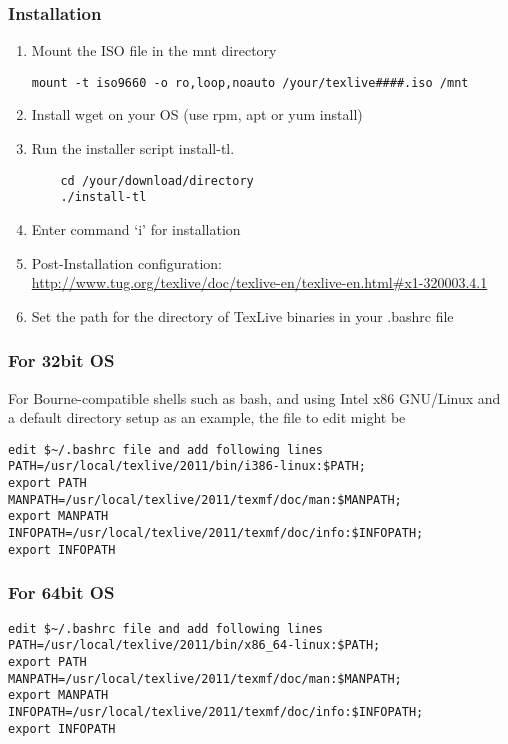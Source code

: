 \subsubsection*{Installation}
\begin{enumerate}
\item	Mount the ISO file in the mnt directory
\begin{verbatim}
mount -t iso9660 -o ro,loop,noauto /your/texlive####.iso /mnt
\end{verbatim}

\item	Install wget on your OS (use rpm, apt or yum install)
\item	Run the installer script install-tl.
\begin{verbatim}
	cd /your/download/directory
	./install-tl
\end{verbatim}
\item	Enter command `i' for installation

\item	Post-Installation configuration:\\
\href{http://www.tug.org/texlive/doc/texlive-en/texlive-en.html\#x1-320003.4.1}
{http://www.tug.org/texlive/doc/texlive-en/texlive-en.html\#x1-320003.4.1} 
\item	Set the path for the directory of TexLive binaries in your .bashrc file
\end{enumerate}

\subsubsection*{For 32bit OS}
For Bourne-compatible shells such as bash, and using Intel x86 GNU/Linux and a default directory setup as an example, the file to edit might be \begin{verbatim}
edit $~/.bashrc file and add following lines
PATH=/usr/local/texlive/2011/bin/i386-linux:$PATH; 
export PATH 
MANPATH=/usr/local/texlive/2011/texmf/doc/man:$MANPATH;
export MANPATH 
INFOPATH=/usr/local/texlive/2011/texmf/doc/info:$INFOPATH;
export INFOPATH
\end{verbatim}
\subsubsection*{For 64bit OS}
\begin{verbatim}
edit $~/.bashrc file and add following lines
PATH=/usr/local/texlive/2011/bin/x86_64-linux:$PATH;
export PATH 
MANPATH=/usr/local/texlive/2011/texmf/doc/man:$MANPATH;
export MANPATH 
INFOPATH=/usr/local/texlive/2011/texmf/doc/info:$INFOPATH;
export INFOPATH

\end{verbatim}



